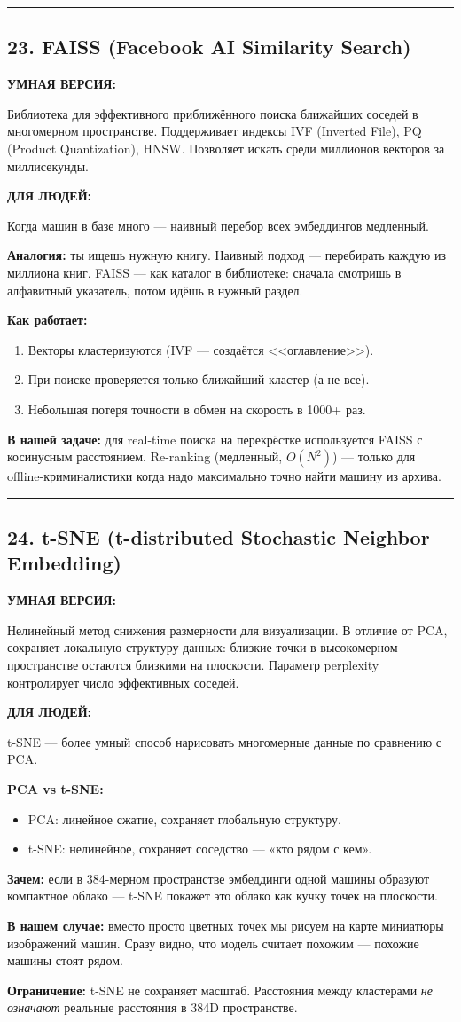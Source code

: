 \documentclass[12pt,a4paper]{article}
\newcommand{\term}[3]{
\noindent\rule{\textwidth}{1pt}
\subsection*{#1}

\textcolor{smartgreen}{\textbf{УМНАЯ ВЕРСИЯ:}}

#2

\vspace{0.5em}
\textcolor{simpleblue}{\textbf{ДЛЯ ЛЮДЕЙ:}}

#3

\vspace{1em}
}
\begin{document}
\term{23. FAISS (Facebook AI Similarity Search)}
{Библиотека для эффективного приближённого поиска ближайших соседей в многомерном пространстве. Поддерживает индексы IVF (Inverted File), PQ (Product Quantization), HNSW. Позволяет искать среди миллионов векторов за миллисекунды.}
{Когда машин в базе много — наивный перебор всех эмбеддингов медленный.

\textbf{Аналогия:} ты ищешь нужную книгу. Наивный подход — перебирать каждую из миллиона книг. FAISS — как каталог в библиотеке: сначала смотришь в алфавитный указатель, потом идёшь в нужный раздел.

\textbf{Как работает:}
\begin{enumerate}
    \item Векторы кластеризуются (IVF — создаётся <<оглавление>>).
    \item При поиске проверяется только ближайший кластер (а не все).
    \item Небольшая потеря точности в обмен на скорость в 1000+ раз.
\end{enumerate}

\textbf{В нашей задаче:} для real-time поиска на перекрёстке используется FAISS с косинусным расстоянием. Re-ranking (медленный, $O(N^2)$) — только для offline-криминалистики когда надо максимально точно найти машину из архива.}

\term{24. t-SNE (t-distributed Stochastic Neighbor Embedding)}
{Нелинейный метод снижения размерности для визуализации. В отличие от PCA, сохраняет локальную структуру данных: близкие точки в высокомерном пространстве остаются близкими на плоскости. Параметр perplexity контролирует число эффективных соседей.}
{t-SNE — более умный способ нарисовать многомерные данные по сравнению с PCA.

\textbf{PCA vs t-SNE:}
\begin{itemize}
    \item PCA: линейное сжатие, сохраняет глобальную структуру.
    \item t-SNE: нелинейное, сохраняет соседство — «кто рядом с кем».
\end{itemize}

\textbf{Зачем:} если в 384-мерном пространстве эмбеддинги одной машины образуют компактное облако — t-SNE покажет это облако как кучку точек на плоскости.

\textbf{В нашем случае:} вместо просто цветных точек мы рисуем на карте миниатюры изображений машин. Сразу видно, что модель считает похожим — похожие машины стоят рядом.

\textbf{Ограничение:} t-SNE не сохраняет масштаб. Расстояния между кластерами \emph{не означают} реальные расстояния в 384D пространстве.}
\end{document}
